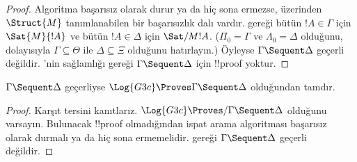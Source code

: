 \begin{proof}
  Algoritma başarısız olarak durur ya da hiç sona ermezse, üzerinden
  $\Struct{M}$ tanımlanabilen bir başarısızlık dalı vardır. 
  gereği bütün $!A \in \Gamma$ için $\Sat{M}{!A}$ ve bütün $!A \in \Delta$
  için $\Sat/{M}{!A}$. ($\Pi_0 = \Gamma$ ve $\Lambda_0 = \Delta$ olduğunu,
  dolayısıyla $\Gamma \subseteq \Theta$ ile $\Delta \subseteq \Xi$ olduğunu
  hatırlayın.) Öyleyse $\Gamma \Sequent \Delta$ geçerli değildir.
  'nin sağlamlığı gereği $\Gamma \Sequent \Delta$ için !!{proof}
  yoktur.
\end{proof}

\begin{cor}
$\Gamma \Sequent \Delta$ geçerliyse $\Log{G3c} \Proves \Gamma \Sequent
\Delta$ olduğundan  tamdır.
\end{cor}

\begin{proof}
  Karşıt tersini kanıtlarız. $\Log{G3c} \Proves/ \Gamma \Sequent \Delta$
  olduğunu varsayın. Bulunacak !!{proof} olmadığından ispat arama algoritması
  başarısız olarak durmalı ya da hiç sona ermemelidir. 
  gereği $\Gamma \Sequent \Delta$ geçerli değildir.
\end{proof}


